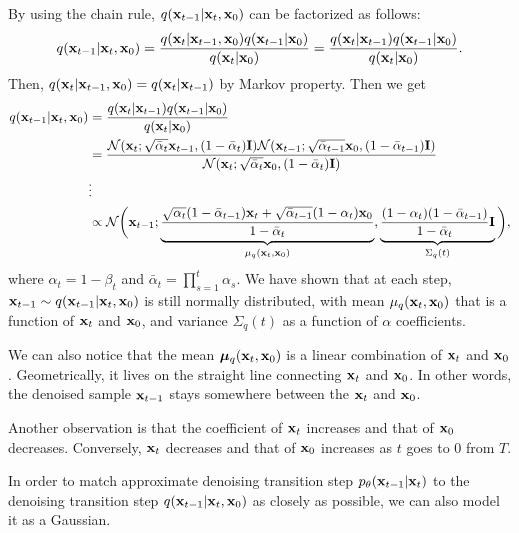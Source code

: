 By using the chain rule, $q({\mathbf{x}}_{t-1}|{\mathbf{x}}_t, {\mathbf{x}}_0)$ can be factorized as follows:
\begin{align*}
	q({\mathbf{x}}_{t-1}|{\mathbf{x}}_t, {\mathbf{x}}_0) = \frac{q({\mathbf{x}}_{t}|{\mathbf{x}}_{t-1}, {\mathbf{x}}_0)q({\mathbf{x}}_{t-1}|{\mathbf{x}}_0)}{q({\mathbf{x}}_{t}|{\mathbf{x}}_0)}=\frac{q({\mathbf{x}}_{t}|{\mathbf{x}}_{t-1})q({\mathbf{x}}_{t-1}|{\mathbf{x}}_0)}{q({\mathbf{x}}_{t}|{\mathbf{x}}_0)}.
\end{align*}
Then, $q({\mathbf{x}}_{t}|{\mathbf{x}}_{t-1}, {\mathbf{x}}_0) = q({\mathbf{x}}_{t}|{\mathbf{x}}_{t-1})$ by Markov property. Then we get
\begin{align}
	q({\mathbf{x}}_{t-1}|{\mathbf{x}}_t, {\mathbf{x}}_0) &=\frac{q({\mathbf{x}}_{t}|{\mathbf{x}}_{t-1})q({\mathbf{x}}_{t-1}|{\mathbf{x}}_0)}{q({\mathbf{x}}_{t}|{\mathbf{x}}_0)}\\
								 &= \frac{\mathcal{N}(\mathbf{x}_t; \sqrt{\bar{\alpha}_t} {\mathbf{x}}_{t-1}, (1-\bar{\alpha}_t)\mathbf{I})\mathcal{N}(\mathbf{x}_{t-1}; \sqrt{\bar{\alpha}_{t-1}} {\mathbf{x}}_{0}, (1-\bar{\alpha}_{t-1})\mathbf{I})}{\mathcal{N}(\mathbf{x}_t; \sqrt{\bar{\alpha}_t} {\mathbf{x}}_{0}, (1-\bar{\alpha}_t)\mathbf{I})}\\
								 & \vdots\\
								 &\propto \mathcal{N}\bigg({\mathbf{x}}_{t-1};\underbrace{\frac{\sqrt{{\alpha}_{t}}(1-\bar{\alpha}_{t-1}){\mathbf{x}}_t+\sqrt{\bar{\alpha}_{t-1}}(1-{\alpha}_{t}){\mathbf{x}}_0}{1-\bar{\alpha}_{t}}}_{\mu_q({\mathbf{x}}_t,{\mathbf{x}}_0)}, \underbrace{\frac{(1-{\alpha}_{t})(1-\bar{\alpha}_{t-1})}{1-\bar{\alpha}_{t}}\mathbf{I}}_{\Sigma_{q}(t)}\bigg),
	\label{eq:diffusion_kl_true_denoising}
\end{align}
where $\alpha_t = 1-\beta_t$ and $\bar{\alpha}_t = \prod_{s=1}^t \alpha_s$. We have shown that at each step, ${\mathbf{x}}_{t-1} \sim q({\mathbf{x}}_{t-1}|{\mathbf{x}}_t, {\mathbf{x}}_0)$ is still normally distributed, with mean $\mu_q({\mathbf{x}}_t,{\mathbf{x}}_0)$ that is a function of ${\mathbf{x}}_t$ and ${\mathbf{x}}_0$, and variance $\Sigma_q(t)$ as a function of $\alpha$ coefficients. 

We can also notice that the mean $\boldsymbol{\mu}_q({\mathbf{x}}_t,{\mathbf{x}}_0)$ is a linear combination of ${\mathbf{x}}_t$ and ${\mathbf{x}}_0$. Geometrically, it lives on the straight line connecting ${\mathbf{x}}_t$ and ${\mathbf{x}}_0$. In other words, the denoised sample ${\mathbf{x}}_{t-1}$ stays somewhere between the ${\mathbf{x}}_t$ and ${\mathbf{x}}_0$.

Another observation is that the coefficient of ${\mathbf{x}}_t$ increases and that of ${\mathbf{x}}_0$ decreases. Conversely, ${\mathbf{x}}_t$ decreases and that of ${\mathbf{x}}_0$ increases as $t$ goes to 0 from $T$.

In order to match approximate denoising transition step $p_\theta({\mathbf{x}}_{t-1}|{\mathbf{x}}_{t})$ to the denoising transition step $q({\mathbf{x}}_{t-1}|{\mathbf{x}}_t, {\mathbf{x}}_0)$ as closely as possible, we can also model it as a Gaussian.

